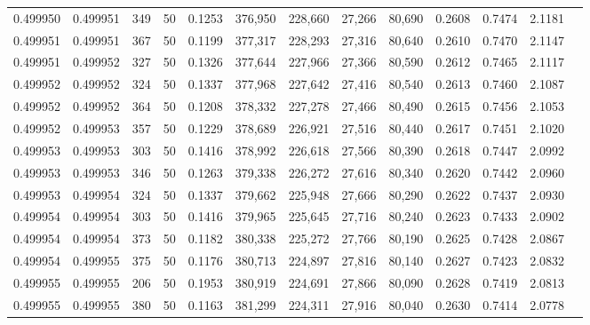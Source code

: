 \begin{tabular}{rrrrrrrrrrrrr}
0.499950 & 0.499951 &   349 &  50 &                                     0.1253 & 376,950 & 228,660 &  27,266 &  80,690 & 0.2608 & 0.7474 & 2.1181 \\
0.499951 & 0.499951 &   367 &  50 &                                     0.1199 & 377,317 & 228,293 &  27,316 &  80,640 & 0.2610 & 0.7470 & 2.1147 \\
0.499951 & 0.499952 &   327 &  50 &                                     0.1326 & 377,644 & 227,966 &  27,366 &  80,590 & 0.2612 & 0.7465 & 2.1117 \\
0.499952 & 0.499952 &   324 &  50 &                                     0.1337 & 377,968 & 227,642 &  27,416 &  80,540 & 0.2613 & 0.7460 & 2.1087 \\
0.499952 & 0.499952 &   364 &  50 &                                     0.1208 & 378,332 & 227,278 &  27,466 &  80,490 & 0.2615 & 0.7456 & 2.1053 \\
0.499952 & 0.499953 &   357 &  50 &                                     0.1229 & 378,689 & 226,921 &  27,516 &  80,440 & 0.2617 & 0.7451 & 2.1020 \\
0.499953 & 0.499953 &   303 &  50 &                                     0.1416 & 378,992 & 226,618 &  27,566 &  80,390 & 0.2618 & 0.7447 & 2.0992 \\
0.499953 & 0.499953 &   346 &  50 &                                     0.1263 & 379,338 & 226,272 &  27,616 &  80,340 & 0.2620 & 0.7442 & 2.0960 \\
0.499953 & 0.499954 &   324 &  50 &                                     0.1337 & 379,662 & 225,948 &  27,666 &  80,290 & 0.2622 & 0.7437 & 2.0930 \\
0.499954 & 0.499954 &   303 &  50 &                                     0.1416 & 379,965 & 225,645 &  27,716 &  80,240 & 0.2623 & 0.7433 & 2.0902 \\
0.499954 & 0.499954 &   373 &  50 &                                     0.1182 & 380,338 & 225,272 &  27,766 &  80,190 & 0.2625 & 0.7428 & 2.0867 \\
0.499954 & 0.499955 &   375 &  50 &                                     0.1176 & 380,713 & 224,897 &  27,816 &  80,140 & 0.2627 & 0.7423 & 2.0832 \\
0.499955 & 0.499955 &   206 &  50 &                                     0.1953 & 380,919 & 224,691 &  27,866 &  80,090 & 0.2628 & 0.7419 & 2.0813 \\
0.499955 & 0.499955 &   380 &  50 &                                     0.1163 & 381,299 & 224,311 &  27,916 &  80,040 & 0.2630 & 0.7414 & 2.0778 \\

\end{tabular}

